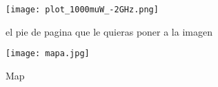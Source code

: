 \graphicspath{{../Graphics/Cpt2-InjectCW/}}


		\begin{figure}[H]
			\centering
			\texttt{[image: plot\_1000muW\_-2GHz.png]}
			\caption{\label{Img:widgets}el pie de pagina que le quieras 	poner a la imagen}
		\end{figure}


			\begin{figure}[H]
				\centering
				\texttt{[image: mapa.jpg]}
				\caption{\label{fig:map}Map}	
			\end{figure}

